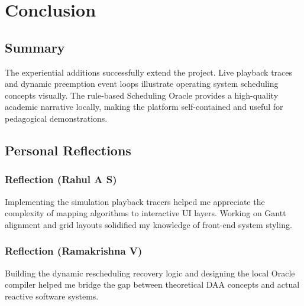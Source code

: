 \documentclass[12pt,a4paper]{article}
\begin{document}
\section{Conclusion}

\subsection{Summary}
The experiential additions successfully extend the project. Live playback traces and dynamic preemption event loops illustrate operating system scheduling concepts visually. The rule-based Scheduling Oracle provides a high-quality academic narrative locally, making the platform self-contained and useful for pedagogical demonstrations.

\subsection{Personal Reflections}
\subsubsection{Reflection (Rahul A S)}
Implementing the simulation playback tracers helped me appreciate the complexity of mapping algorithms to interactive UI layers. Working on Gantt alignment and grid layouts solidified my knowledge of front-end system styling.

\subsubsection{Reflection (Ramakrishna V)}
Building the dynamic rescheduling recovery logic and designing the local Oracle compiler helped me bridge the gap between theoretical DAA concepts and actual reactive software systems.


\end{document}

